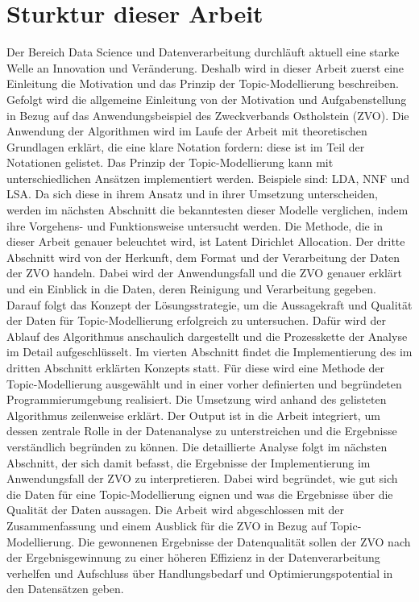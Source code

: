 \documentclass[german,version-2020-11]{uzl-thesis}
\begin{document}
\section{Sturktur dieser Arbeit}
Der Bereich Data Science und Datenverarbeitung durchläuft aktuell eine starke Welle an Innovation und Veränderung. Deshalb wird in dieser Arbeit zuerst eine Einleitung die Motivation und das Prinzip der Topic-Modellierung beschreiben. Gefolgt wird die allgemeine Einleitung von der Motivation und Aufgabenstellung in Bezug auf das Anwendungsbeispiel des Zweckverbands Ostholstein (ZVO). Die Anwendung der Algorithmen wird im Laufe der Arbeit mit theoretischen Grundlagen erklärt, die eine klare Notation fordern: diese ist im Teil der Notationen gelistet. Das Prinzip der Topic-Modellierung kann mit unterschiedlichen Ansätzen implementiert werden. Beispiele sind: LDA, NNF und LSA. Da sich diese in ihrem Ansatz und in ihrer Umsetzung unterscheiden, werden im nächsten Abschnitt die bekanntesten dieser Modelle verglichen, indem ihre Vorgehens- und Funktionsweise untersucht werden. Die Methode, die in dieser Arbeit genauer beleuchtet wird, ist Latent Dirichlet Allocation. Der dritte Abschnitt wird von der Herkunft, dem Format und der Verarbeitung der Daten der ZVO handeln. Dabei wird der Anwendungsfall und die ZVO genauer erklärt und ein Einblick in die Daten, deren Reinigung und Verarbeitung gegeben. Darauf folgt das Konzept der Lösungsstrategie, um die Aussagekraft und Qualität der Daten für Topic-Modellierung erfolgreich zu untersuchen. Dafür wird der Ablauf des Algorithmus anschaulich dargestellt und die Prozesskette der Analyse im Detail aufgeschlüsselt. Im vierten Abschnitt findet die Implementierung des im dritten Abschnitt erklärten Konzepts statt. Für diese wird eine Methode der Topic-Modellierung ausgewählt und in einer vorher definierten und begründeten Programmierumgebung realisiert. Die Umsetzung wird anhand des gelisteten Algorithmus zeilenweise erklärt. Der Output ist in die Arbeit integriert, um dessen zentrale Rolle in der Datenanalyse zu unterstreichen und die Ergebnisse verständlich begründen zu können. Die detaillierte Analyse folgt im nächsten Abschnitt, der sich damit befasst, die Ergebnisse der Implementierung im Anwendungsfall der ZVO zu interpretieren. Dabei wird begründet, wie gut sich die Daten für eine Topic-Modellierung eignen und was die Ergebnisse über die Qualität der Daten aussagen. Die Arbeit wird abgeschlossen mit der Zusammenfassung und einem Ausblick für die ZVO in Bezug auf Topic-Modellierung. Die gewonnenen Ergebnisse der Datenqualität sollen der ZVO nach der Ergebnisgewinnung zu einer höheren Effizienz in der Datenverarbeitung verhelfen und Aufschluss über Handlungsbedarf und Optimierungspotential in den Datensätzen geben.
\end{document}
